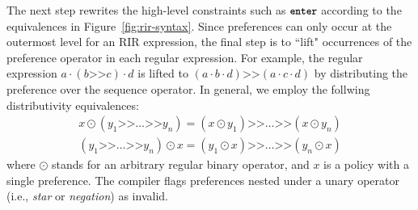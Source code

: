 \documentclass[10pt]{sigalternate052015}
\newcommand{\KW}[1]{\texttt{\small\bfseries{#1}}}
\newcommand{\Prefer}{\texttt{>>}}
\newcommand{\Enter}{\KW{enter}}
\renewcommand{\path}[2]{ #1 \mapsto \ensuremath{#2} }
\begin{document}
The next step rewrites the high-level constraints such as $\Enter$ according to the equivalences in Figure~\ref{fig:rir-syntax}. Since preferences can only occur at the outermost level for an RIR expression, the final step is to ``lift" occurrences of the preference operator in each regular expression. For example, the regular expression $a \cdot (b \Prefer c) \cdot d$ is lifted to $(a \cdot b \cdot d) \Prefer (a \cdot c \cdot d)$ by distributing the preference over the sequence operator. In general, we employ the follwing distributivity equivalences:
%
\[
\begin{array}{c}
  x \odot (y_1 \Prefer \dots \Prefer y_n) = (x \odot y_1) \Prefer \dots \Prefer (x \odot y_n) \\
  (y_1 \Prefer \dots \Prefer y_n) \odot x = (y_1 \odot x) \Prefer \dots \Prefer (y_n \odot x)
\end{array}
\]
%
where $\odot$ stands for an arbitrary regular binary operator, and $x$ is a policy with a single preference. The compiler flags preferences nested under a unary operator (i.e., \textit{star} or \textit{negation}) as invalid.





\newcommand{\state}[4]{\node[state,#3](#1)[#4]{#2};}
\newcommand{\transition}[4]{\path[->] (#1) edge [#4] node {#3} (#2);}
\end{document}
